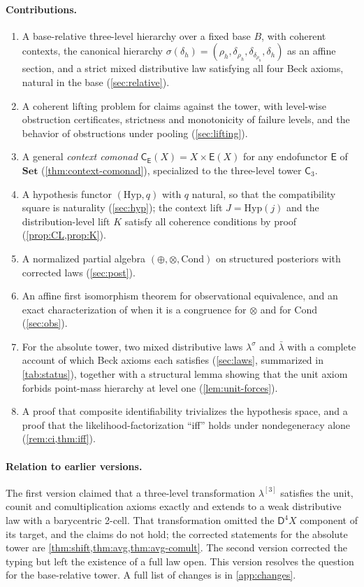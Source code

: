 \documentclass[11pt]{article}
\theoremstyle{definition}
\theoremstyle{remark}
\newcommand{\D}{\mathsf{D}}
\newcommand{\Set}{\mathbf{Set}}
\newcommand{\Hyp}{\mathrm{Hyp}}
\newcommand{\Cond}{\mathrm{Cond}}
\newcommand{\C}{\mathsf{C}}
\newcommand{\E}{\mathsf{E}}
\newcommand{\lb}{\bar\lambda}
\newcommand{\ls}{\lambda^{\sigma}}
\begin{document}
\paragraph{Contributions.}
\begin{enumerate}[leftmargin=*]
\item A base-relative three-level hierarchy over a fixed base $B$, with coherent contexts, the
  canonical hierarchy $\sigma(\delta_h)=(\rho_h,\delta_{\rho_h},\delta_{\delta_{\rho_h}},\delta_h)$ as an
  affine section, and a strict mixed distributive law satisfying all four Beck axioms, natural in the
  base (\cref{sec:relative}).
\item A coherent lifting problem for claims against the tower, with level-wise obstruction
  certificates, strictness and monotonicity of failure levels, and the behavior of obstructions under
  pooling (\cref{sec:lifting}).
\item A general \emph{context comonad} $\C_\E(X)=X\times\E(X)$ for any endofunctor $\E$ of $\Set$
  (\cref{thm:context-comonad}), specialized to the three-level tower $\C_3$.
\item A hypothesis functor $(\Hyp,q)$ with $q$ natural, so that the compatibility square is
  naturality (\cref{sec:hyp}); the context lift $J=\Hyp(j)$ and the distribution-level lift $K$
  satisfy all coherence conditions by proof (\cref{prop:CL,prop:K}).
\item A normalized partial algebra $(\oplus,\otimes,\Cond)$ on structured posteriors with corrected
  laws (\cref{sec:post}).
\item An affine first isomorphism theorem for observational equivalence, and an exact
  characterization of when it is a congruence for $\otimes$ and for $\Cond$ (\cref{sec:obs}).
\item For the absolute tower, two mixed distributive laws $\ls$ and $\lb$ with a complete account
  of which Beck axioms each satisfies (\cref{sec:laws}, summarized in \cref{tab:status}), together with a structural lemma
  showing that the unit axiom forbids point-mass hierarchy at level one (\cref{lem:unit-forces}).
\item A proof that composite identifiability trivializes the hypothesis space, and a proof that the
  likelihood-factorization ``iff'' holds under nondegeneracy alone (\cref{rem:ci,thm:iff}).
\end{enumerate}

\paragraph{Relation to earlier versions.} The first version claimed that a three-level
transformation $\lambda^{[3]}$ satisfies the unit, counit and comultiplication axioms exactly and
extends to a weak distributive law with a barycentric 2-cell. That transformation omitted the
$\D^4X$ component of its target, and the claims do not hold; the corrected statements for the
absolute tower are \cref{thm:shift,thm:avg,thm:avg-comult}. The second version corrected the typing
but left the existence of a full law open. This version resolves the question for the base-relative
tower. A full list of changes is in \cref{app:changes}.
\end{document}
